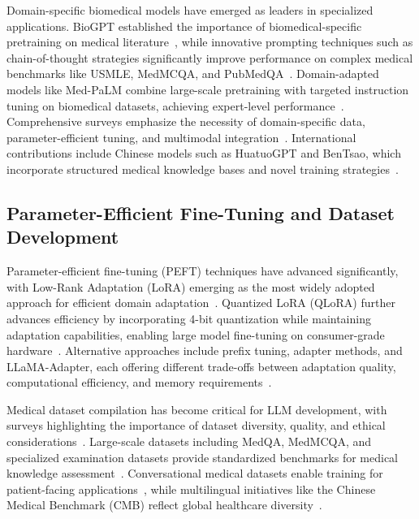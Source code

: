 \documentclass[conference]{IEEEtran}
\begin{document}
Domain-specific biomedical models have emerged as leaders in specialized applications. BioGPT established the importance of biomedical-specific pretraining on medical literature~\cite{li2022biogpt}, while innovative prompting techniques such as chain-of-thought strategies significantly improve performance on complex medical benchmarks like USMLE, MedMCQA, and PubMedQA~\cite{lievin2024can}. Domain-adapted models like Med-PaLM combine large-scale pretraining with targeted instruction tuning on biomedical datasets, achieving expert-level performance~\cite{singhal2025toward}. Comprehensive surveys emphasize the necessity of domain-specific data, parameter-efficient tuning, and multimodal integration~\cite{wang2023pre}. International contributions include Chinese models such as HuatuoGPT and BenTsao, which incorporate structured medical knowledge bases and novel training strategies~\cite{wang2023huatuo,chen2023huatuogpt}.

\subsection{Parameter-Efficient Fine-Tuning and Dataset Development}

Parameter-efficient fine-tuning (PEFT) techniques have advanced significantly, with Low-Rank Adaptation (LoRA) emerging as the most widely adopted approach for efficient domain adaptation~\cite{hu2021lora}. Quantized LoRA (QLoRA) further advances efficiency by incorporating 4-bit quantization while maintaining adaptation capabilities, enabling large model fine-tuning on consumer-grade hardware~\cite{dettmers2023qlora,wolfe2023easily}. Alternative approaches include prefix tuning, adapter methods, and LLaMA-Adapter, each offering different trade-offs between adaptation quality, computational efficiency, and memory requirements~\cite{zhang2023llamaadapter,kumar2024peft}.

Medical dataset compilation has become critical for LLM development, with surveys highlighting the importance of dataset diversity, quality, and ethical considerations~\cite{zhang2024survey,liu2024datasets}. Large-scale datasets including MedQA, MedMCQA, and specialized examination datasets provide standardized benchmarks for medical knowledge assessment~\cite{jin2021disease,pal2022medmcqa}. Conversational medical datasets enable training for patient-facing applications~\cite{li2023chatdoctor}, while multilingual initiatives like the Chinese Medical Benchmark (CMB) reflect global healthcare diversity~\cite{wang2023cmb}.
\end{document}
